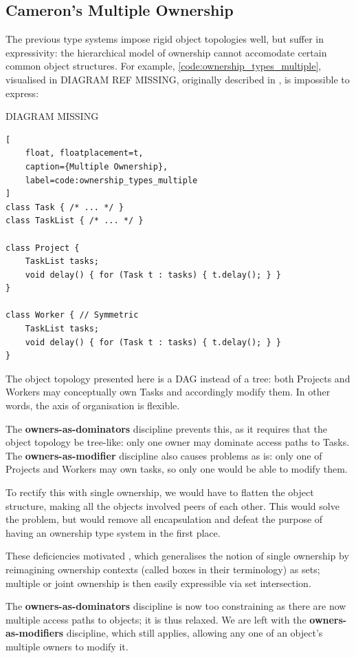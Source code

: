 \documentclass{acm_proc_article-sp}
\begin{document}
\subsection{Cameron's Multiple Ownership}
\label{subsec:cameron}

The previous type systems impose rigid object topologies well, but suffer in
expressivity: the hierarchical model of ownership cannot accomodate certain
common object structures. For example,
\cref{code:ownership_types_multiple}, visualised in DIAGRAM REF
MISSING, originally described in
\cite{cameron07mojo}, is impossible to express:

DIAGRAM MISSING

\begin{lstlisting}[
	float, floatplacement=t,
	caption={Multiple Ownership},
	label=code:ownership_types_multiple
]
class Task { /* ... */ }
class TaskList { /* ... */ }

class Project {
	TaskList tasks;
	void delay() { for (Task t : tasks) { t.delay(); } }
}

class Worker { // Symmetric
	TaskList tasks;
	void delay() { for (Task t : tasks) { t.delay(); } }
}
\end{lstlisting}

The object topology presented here is a DAG instead of a tree: both Projects and
Workers may conceptually own Tasks and accordingly modify them. In other words,
the axis of organisation is flexible.

The \textbf{owners-as-dominators} discipline prevents this, as it requires that
the object topology be tree-like: only one owner may dominate access paths to
Tasks. The \textbf{owners-as-modifier} discipline also causes problems as is:
only one of Projects and Workers may own tasks, so only one would be able to
modify them.

To rectify this with single ownership, we would have to flatten the object
structure, making all the objects involved peers of each other. This would solve
the problem, but would remove all encapsulation and defeat the purpose of having
an ownership type system in the first place.

These deficiencies motivated \cite{cameron07mojo}, which generalises the notion
of single ownership by reimagining ownership contexts (called boxes in their
terminology) as sets; multiple or joint ownership is then easily expressible via
set intersection.

The \textbf{owners-as-dominators} discipline is now too constraining as there
are now multiple access paths to objects; it is thus relaxed. We are left with
the \textbf{owners-as-modifiers} discipline, which still applies, allowing any
one of an object's multiple owners to modify it.
\end{document}
